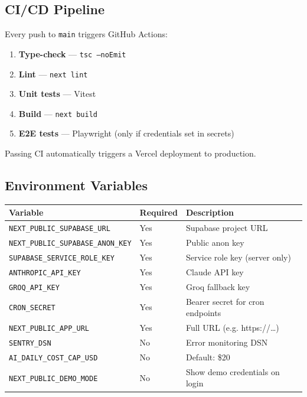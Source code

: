 \documentclass[11pt, a4paper]{article}
\begin{document}
\subsection{CI/CD Pipeline}

Every push to \texttt{main} triggers GitHub Actions:

\begin{enumerate}
  \item \textbf{Type-check} — \texttt{tsc --noEmit}
  \item \textbf{Lint} — \texttt{next lint}
  \item \textbf{Unit tests} — Vitest
  \item \textbf{Build} — \texttt{next build}
  \item \textbf{E2E tests} — Playwright (only if credentials set in secrets)
\end{enumerate}

Passing CI automatically triggers a Vercel deployment to production.

\subsection{Environment Variables}

\begin{center}
\begin{tabular}{lll}
  \toprule
  \textbf{Variable} & \textbf{Required} & \textbf{Description} \\
  \midrule
  \texttt{NEXT\_PUBLIC\_SUPABASE\_URL}      & Yes & Supabase project URL \\
  \texttt{NEXT\_PUBLIC\_SUPABASE\_ANON\_KEY}& Yes & Public anon key \\
  \texttt{SUPABASE\_SERVICE\_ROLE\_KEY}     & Yes & Service role key (server only) \\
  \texttt{ANTHROPIC\_API\_KEY}              & Yes & Claude API key \\
  \texttt{GROQ\_API\_KEY}                   & Yes & Groq fallback key \\
  \texttt{CRON\_SECRET}                     & Yes & Bearer secret for cron endpoints \\
  \texttt{NEXT\_PUBLIC\_APP\_URL}           & Yes & Full URL (e.g. https://\ldots) \\
  \texttt{SENTRY\_DSN}                      & No  & Error monitoring DSN \\
  \texttt{AI\_DAILY\_COST\_CAP\_USD}        & No  & Default: \$20 \\
  \texttt{NEXT\_PUBLIC\_DEMO\_MODE}         & No  & Show demo credentials on login \\
  \bottomrule
\end{tabular}
\end{center}
\end{document}

